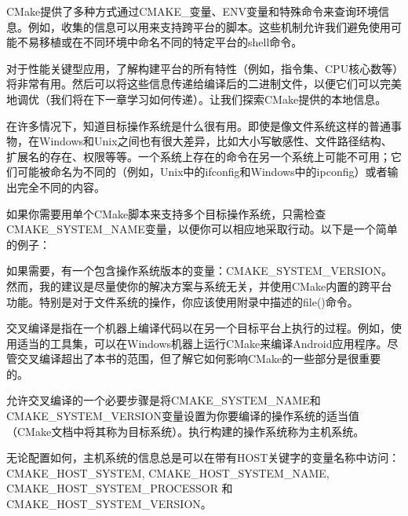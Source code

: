 CMake提供了多种方式通过CMAKE\_变量、ENV变量和特殊命令来查询环境信息。例如，收集的信息可以用来支持跨平台的脚本。这些机制允许我们避免使用可能不易移植或在不同环境中命名不同的特定平台的shell命令。

对于性能关键型应用，了解构建平台的所有特性（例如，指令集、CPU核心数等）将非常有用。然后可以将这些信息传递给编译后的二进制文件，以便它们可以完美地调优（我们将在下一章学习如何传递）。让我们探索CMake提供的本地信息。


在许多情况下，知道目标操作系统是什么很有用。即使是像文件系统这样的普通事物，在Windows和Unix之间也有很大差异，比如大小写敏感性、文件路径结构、扩展名的存在、权限等等。一个系统上存在的命令在另一个系统上可能不可用；它们可能被命名为不同的（例如，Unix中的ifconfig和Windows中的ipconfig）或者输出完全不同的内容。

如果你需要用单个CMake脚本来支持多个目标操作系统，只需检查CMAKE\_SYSTEM\_NAME变量，以便你可以相应地采取行动。以下是一个简单的例子：


如果需要，有一个包含操作系统版本的变量：CMAKE\_SYSTEM\_VERSION。然而，我的建议是尽量使你的解决方案与系统无关，并使用CMake内置的跨平台功能。特别是对于文件系统的操作，你应该使用附录中描述的file()命令。


交叉编译是指在一个机器上编译代码以在另一个目标平台上执行的过程。例如，使用适当的工具集，可以在Windows机器上运行CMake来编译Android应用程序。尽管交叉编译超出了本书的范围，但了解它如何影响CMake的一些部分是很重要的。

允许交叉编译的一个必要步骤是将CMAKE\_SYSTEM\_NAME和CMAKE\_SYSTEM\_VERSION变量设置为你要编译的操作系统的适当值（CMake文档中将其称为目标系统）。执行构建的操作系统称为主机系统。

无论配置如何，主机系统的信息总是可以在带有HOST关键字的变量名称中访问： CMAKE\_HOST\_SYSTEM, CMAKE\_HOST\_SYSTEM\_NAME, CMAKE\_HOST\_SYSTEM\_PROCESSOR 和 CMAKE\_HOST\_SYSTEM\_VERSION。

